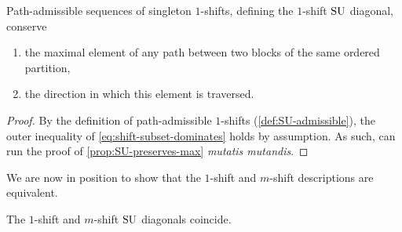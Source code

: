 \begin{corollary} 
\label{cor:SU-1-shift-preserves-max}
Path-admissible sequences of singleton $1$-shifts, defining the $1$-shift $\mathrm{SU}$ diagonal, conserve 
\begin{enumerate}
\item the maximal element of any path between two blocks of the same ordered partition,
\item the direction in which this element is traversed. 
\end{enumerate}
\end{corollary}

\begin{proof}
By the definition of path-admissible $1$-shifts (\cref{def:SU-admissible}), the outer inequality of \cref{eq:shift-subset-dominates} holds by assumption.
As such, can run the proof of \cref{prop:SU-preserves-max} \emph{mutatis mutandis}.
\end{proof}

We are now in position to show that the $1$-shift and $m$-shift descriptions are equivalent. 


\begin{proposition}
\label{prop:iso-1-to-m-shift}
The $1$-shift and $m$-shift $\mathrm{SU}$ diagonals coincide.
\end{proposition}

